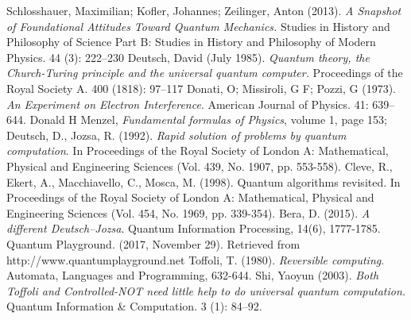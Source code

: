 \documentclass[12pt,a4paper,openright]{report}
\begin{document}
\begin{thebibliography}{30}
     Schlosshauer, Maximilian; Kofler, Johannes; Zeilinger, Anton (2013). \emph{A Snapshot of Foundational Attitudes Toward Quantum Mechanics.} Studies in History and Philosophy of Science Part B: Studies in History and Philosophy of Modern Physics. 44 (3): 222–230
     Deutsch, David (July 1985). \emph{Quantum theory, the Church-Turing principle and the universal quantum computer.} Proceedings of the Royal Society A. 400 (1818): 97–117
     Donati, O; Missiroli, G F; Pozzi, G (1973). \emph{An Experiment on Electron Interference}. American Journal of Physics. 41: 639–644.
     Donald H Menzel, \emph{Fundamental formulas of Physics}, volume 1, page 153; 
     Deutsch, D., Jozsa, R. (1992). \emph{Rapid solution of problems by quantum computation}. In Proceedings of the Royal Society of London A: Mathematical, Physical and Engineering Sciences (Vol. 439, No. 1907, pp. 553-558).
     Cleve, R., Ekert, A., Macchiavello, C., Mosca, M. (1998). Quantum algorithms revisited. In Proceedings of the Royal Society of London A: Mathematical, Physical and Engineering Sciences (Vol. 454, No. 1969, pp. 339-354). 
     Bera, D. (2015). \emph{A different Deutsch–Jozsa}. Quantum Information Processing, 14(6), 1777-1785.
     Quantum Playground. (2017, November 29). Retrieved  from http://www.quantumplayground.net 
     Toffoli, T. (1980). \emph{Reversible computing}. Automata, Languages and Programming, 632-644.
      Shi, Yaoyun (2003). \emph{Both Toffoli and Controlled-NOT need little help to do universal quantum computation.} Quantum Information & Computation. 3 (1): 84–92. 
\end{thebibliography}
\end{document}
